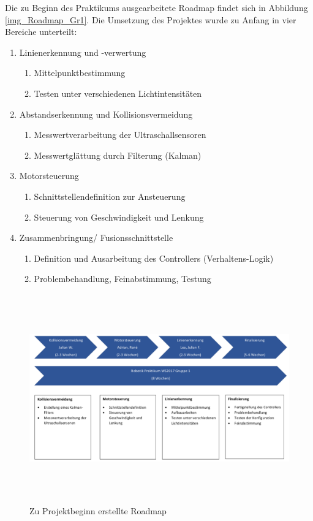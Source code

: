 \documentclass[12pt, a4paper]{scrartcl}
\begin{document}
Die zu Beginn des Praktikums ausgearbeitete Roadmap findet sich in Abbildung \ref{img_Roadmap_Gr1}.
\newpage
Die Umsetzung des Projektes wurde zu Anfang in vier Bereiche unterteilt:
\begin{enumerate}
		\item{Linienerkennung und -verwertung
		\begin{enumerate}
			\item Mittelpunktbestimmung
			\item Testen unter verschiedenen Lichtintensitäten
	\end{enumerate}}
	\item{Abstandserkennung und Kollisionsvermeidung
	\begin{enumerate}
		\item Messwertverarbeitung der Ultraschallsensoren
		\item Messwertglättung durch Filterung (Kalman)
	\end{enumerate}}
	\item {Motorsteuerung
		\begin{enumerate}
		\item Schnittstellendefinition zur Ansteuerung
		\item Steuerung von Geschwindigkeit und Lenkung
		\end{enumerate}}
		\item{Zusammenbringung/ Fusionsschnittstelle
		\begin{enumerate}
			\item Definition und Ausarbeitung des Controllers (Verhaltens-Logik)
			\item Problembehandlung, Feinabstimmung, Testung
		\end{enumerate}}
\end{enumerate}

\begin{figure}
\centering
\includegraphics[width=\textwidth, height=9cm, keepaspectratio]{Bilder/Roadmap_Gr1.pdf}
\caption{Zu Projektbeginn erstellte Roadmap}
\label{img:Roadmap_Gr1}
\end{figure}
\end{document}
